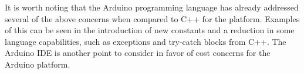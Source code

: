 It is worth noting that the Arduino programming language has already addressed several of the above concerns when compared to C++ for the platform. Examples of this can be seen in the introduction of new constants and a reduction in some language capabilities, such as exceptions and try-catch blocks from C++. The Arduino IDE is another point to consider in favor of cost concerns for the Arduino platform.
